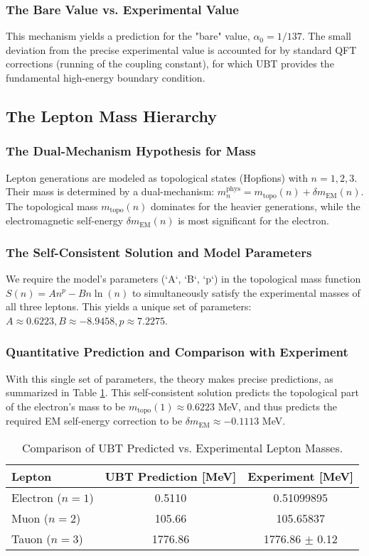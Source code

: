 \documentclass[12pt, a4paper]{article}
\begin{document}
\subsubsection{The Bare Value vs. Experimental Value}
This mechanism yields a prediction for the "bare" value, \( \alpha_0 = 1/137 \). The small deviation from the precise experimental value is accounted for by standard QFT corrections (running of the coupling constant), for which UBT provides the fundamental high-energy boundary condition.

\subsection{The Lepton Mass Hierarchy}
\subsubsection{The Dual-Mechanism Hypothesis for Mass}
Lepton generations are modeled as topological states (Hopfions) with \( n=1,2,3 \). Their mass is determined by a dual-mechanism: \( m_n^{\text{phys}} = m_{\text{topo}}(n) + \delta m_{\text{EM}}(n) \). The topological mass \( m_{\text{topo}}(n) \) dominates for the heavier generations, while the electromagnetic self-energy \( \delta m_{\text{EM}}(n) \) is most significant for the electron.

\subsubsection{The Self-Consistent Solution and Model Parameters}
We require the model's parameters (`A`, `B`, `p`) in the topological mass function \( S(n) = A n^p - B n \ln(n) \) to simultaneously satisfy the experimental masses of all three leptons. This yields a unique set of parameters: \( A \approx 0.6223, B \approx -8.9458, p \approx 7.2275 \).

\subsubsection{Quantitative Prediction and Comparison with Experiment}
With this single set of parameters, the theory makes precise predictions, as summarized in Table \ref{tab:masses}. This self-consistent solution predicts the topological part of the electron's mass to be \(m_{\text{topo}}(1) \approx 0.6223\) MeV, and thus predicts the required EM self-energy correction to be \( \delta m_{\text{EM}} \approx -0.1113 \) MeV.

\begin{table}[h!]
\centering
\caption{Comparison of UBT Predicted vs. Experimental Lepton Masses.}
\label{tab:masses}
\begin{tabular}{l|c|c}
\hline
\textbf{Lepton} & \textbf{UBT Prediction [MeV]} & \textbf{Experiment [MeV]} \\
\hline
Electron (\(n=1\)) & 0.5110 & 0.51099895 \\
Muon (\(n=2\)) & 105.66 & 105.65837 \\
Tauon (\(n=3\)) & 1776.86 & 1776.86 \(\pm\) 0.12 \\
\hline
\end{tabular}
\end{table}
\end{document}
